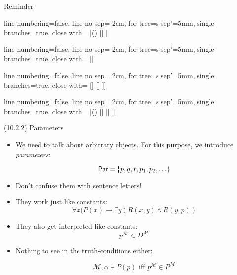 \documentclass[../slides.tex]{subfiles}
\begin{document}
\begin{frame}{Reminder}
\begin{center}
					\begin{prooftree}
					{
					line numbering=false,
					line no sep= 2cm,
					for tree={s sep'=5mm},
					single branches=true,
					close with=\xmark
					}
					[\neg (\phi\to\psi) [\phi [\neg \psi ] ] ]
					\end{prooftree}
					\begin{prooftree}
					{
					line numbering=false,
					line no sep= 2cm,
					for tree={s sep'=5mm},
					single branches=true,
					close with=\xmark
					}
					[\phi\to\psi [\neg \phi ] [\psi ] ]
					\end{prooftree}
					\begin{prooftree}
					{
					line numbering=false,
					line no sep= 2cm,
					for tree={s sep'=5mm},
					single branches=true,
					close with=\xmark
					}
					[\phi\leftrightarrow \psi [\phi [\psi] ] [\neg \phi [\neg \psi] ] ]]
					\end{prooftree}
					\begin{prooftree}
					{
					line numbering=false,
					line no sep= 2cm,
					for tree={s sep'=5mm},
					single branches=true,
					close with=\xmark
					}
					[\neg(\phi\leftrightarrow \psi) [\phi [\neg \psi] ] [\neg \phi [ \psi] ] ]]
					\end{prooftree}

				\end{center}
				
				

\end{frame}

\begin{frame}{(10.2.2) Parameters}

	\begin{itemize}
		
		\item We need to talk about arbitrary objects. For this purpose, we introduce \emph{parameters}:
		
		\[\mathsf{Par}=\{p,q,r,p_1, p_2, \mathellipsis\}\]
		
		\item Don't confuse them with sentence letters!
		
		\item They work just like constants: \[\forall x(P(x)\to \exists y(R(x,y)\land R(y,p))\]
		
		\item They also get interpreted like constants: \[p^\mathcal{M}\in D^\mathcal{M}\]
		
		\item Nothing to see in the truth-conditions either:
		
		\[\mathcal{M},\alpha\vDash P(p)\text{ iff }p^\mathcal{M}\in P^\mathcal{M}\]
	
	\end{itemize}


\end{frame}
\end{document}

